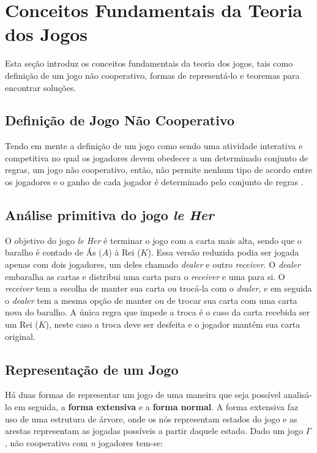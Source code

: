 \section{Conceitos Fundamentais da Teoria dos Jogos}
\label{sec:conceitos-fundamentais-da-teoria-dos-jogos}

Esta seção introduz os conceitos fundamentais da teoria dos jogos, tais como definição de um jogo não cooperativo, formas de representá-lo e teoremas para encontrar soluções.

\subsection{Definição de Jogo Não Cooperativo}
\label{subsec:definicao-de-jogo-nao-cooperativo}

Tendo em mente a definição de um jogo como sendo uma atividade interativa e competitiva no qual os jogadores devem obedecer a um determinado conjunto de regras, um jogo não cooperativo, então, não permite nenhum tipo de acordo entre os jogadores e o ganho de cada jogador é determinado pelo conjunto de regras \cite{jones_1980}.


\subsection{Análise primitiva do jogo \emph{le Her}}
\label{subsec:analise-primitiva-do-jogo-le-her}

O objetivo do jogo \emph{le Her} é terminar o jogo com a carta mais alta, sendo que o baralho é contado de Ás ($A$) à Rei ($K$). Essa versão reduzida podia ser jogada apenas com dois jogadores, um deles chamado \emph{dealer} e outro \emph{receiver}. O \emph{dealer} embaralha as cartas e distribui uma carta para o \emph{receiver} e uma para si. O \emph{receiver} tem a escolha de manter sua carta ou trocá-la com o \emph{dealer}, e em seguida o \emph{dealer} tem a mesma opção de manter ou de trocar sua carta com uma carta nova do baralho. A única regra que impede a troca é o caso da carta recebida ser um Rei ($K$), neste caso a troca deve ser desfeita e o jogador mantém sua carta original.



\subsection{Representação de um Jogo}
\label{subsec:representacao-de-um-jogo}

Há duas formas de representar um jogo de uma maneira que seja possível analisá-lo em seguida, a \textbf{forma extensiva} e a \textbf{forma normal}. A forma extensiva faz uso de uma estrutura de árvore, onde os nós representam estados do jogo e as arestas representam as jogadas possíveis a partir daquele estado. Dado um jogo $\Gamma$, não cooperativo com \emph{n} jogadores tem-se:




